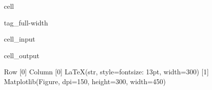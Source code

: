 \documentclass[letterpaper,10pt,english]{jupyterBook}
\begin{document}
\begin{sphinxuseclass}{cell}
\begin{sphinxuseclass}{tag_full-width}
\begin{sphinxVerbatimInput}
\begin{sphinxuseclass}{cell_input}
\begin{sphinxVerbatim}[commandchars=\\\{\}]
  
    

  

  
\end{sphinxVerbatim}

\end{sphinxuseclass}\end{sphinxVerbatimInput}
\begin{sphinxVerbatimOutput}

\begin{sphinxuseclass}{cell_output}
\begin{sphinxVerbatim}[commandchars=\\\{\}]
Row
    [0] Column
        [0] LaTeX(str, style=\PYGZob{}\PYGZsq{}font\PYGZhy{}size\PYGZsq{}: \PYGZsq{}13pt\PYGZsq{}\PYGZcb{}, width=300)
    [1] Matplotlib(Figure, dpi=150, height=300, width=450)
\end{sphinxVerbatim}

\end{sphinxuseclass}\end{sphinxVerbatimOutput}

\end{sphinxuseclass}
\end{sphinxuseclass}
\end{document}
